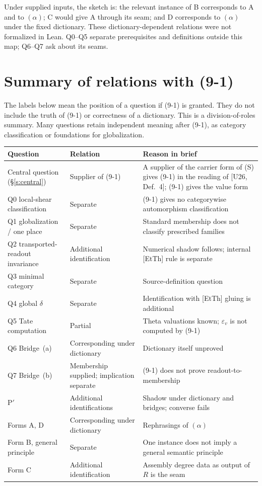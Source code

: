 \documentclass[11pt]{article}
\theoremstyle{definition}
\begin{document}
Under supplied inputs, the sketch is: the relevant instance of B
corresponds to A and to $(\alpha)$; C would give A through its
seam; and D corresponds to $(\alpha)$ under the fixed dictionary.
These dictionary-dependent relations were not formalized in Lean.
Q0--Q5 separate prerequisites and definitions outside this map;
Q6--Q7 ask about its seams.

\section{Summary of relations with (9-1)}\label{s:relations}

The labels below mean the position of a question if (9-1) is
granted.  They do not include the truth of (9-1) or correctness
of a dictionary.  This is a division-of-roles summary.  Many
questions retain independent meaning after (9-1), as category
classification or foundations for globalization.

\begin{center}
\small
\begin{tabular}{@{}p{}p{}p{}@{}}
\toprule
Question & Relation & Reason in brief\\
\midrule
Central question (\S\ref{s:central}) & Supplier of (9-1) & A supplier of the carrier form of (S) gives (9-1) in the reading of [U26, Def.~4]; (9-1) gives the value form\\
Q0 local-shear classification & Separate & (9-1) gives no categorywise automorphism classification\\
Q1 globalization / one place & Separate & Standard membership does not classify prescribed families\\
Q2 transported-readout invariance & Additional identification & Numerical shadow follows; internal [EtTh] rule is separate\\
Q3 minimal category & Separate & Source-definition question\\
Q4 global $\delta$ & Separate & Identification with [EtTh] gluing is additional\\
Q5 Tate computation & Partial & Theta valuations known; $\varepsilon_v$ is not computed by (9-1)\\
Q6 Bridge~(a) & Corresponding under dictionary & Dictionary itself unproved\\
Q7 Bridge~(b) & Membership supplied; implication separate & (9-1) does not prove readout-to-membership\\
P$'$ & Additional identifications & Shadow under dictionary and bridges; converse fails\\
Forms A, D & Corresponding under dictionary & Rephrasings of $(\alpha)$\\
Form B, general principle & Separate & One instance does not imply a general semantic principle\\
Form C & Additional identification & Assembly degree data as output of $R$ is the seam\\
\bottomrule
\end{tabular}
\end{center}
\end{document}
